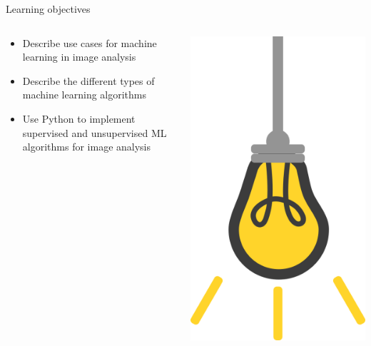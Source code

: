 \documentclass[9pt, aspectratio=169]{beamer}
\begin{document}
\begin{frame}
    {Learning objectives}
    \begin{columns}
        \begin{column}{0.8\textwidth}
            \begin{itemize}
                \item Describe use cases for machine learning in image analysis
                \item Describe the different types of machine learning algorithms
                \item Use Python to implement supervised and unsupervised ML algorithms for image analysis
            \end{itemize}
        \end{column}
        \begin{column}{0.2\textwidth}
            \includegraphics[angle=-30, origin=tr, width=1.5\textwidth]{lightbulb.png}
        \end{column}
    \end{columns}
\end{frame}
\end{document}

